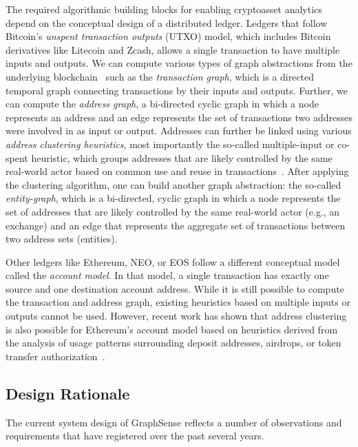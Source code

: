 The required algorithmic building blocks for enabling cryptoasset analytics depend on the conceptual design of a distributed ledger. Ledgers that follow Bitcoin's \emph{unspent transaction outputs} (UTXO) model, which includes Bitcoin derivatives like Litecoin and Zcash, allows a single transaction to have multiple inputs and outputs. We can compute various types of graph abstractions from the underlying blockchain~\cite{Reid:2013aa} such as the \emph{transaction graph}, which is a directed temporal graph connecting transactions by their inputs and outputs. Further, we can compute the \emph{address graph}, a bi-directed cyclic graph in which a node represents an address and an edge represents the set of transactions two addresses were involved in as input or output. Addresses can further be linked using various \emph{address clustering heuristics}, most importantly the so-called multiple-input or co-spent heuristic, which groups addresses that are likely controlled by the same real-world actor based on common use and reuse in transactions~\cite{Meiklejohn:2013aa}. After applying the clustering algorithm, one can build another graph abstraction: the so-called \emph{entity-graph}, which is a bi-directed, cyclic graph in which a node represents the set of addresses that are likely controlled by the same real-world actor (e.g., an exchange) and an edge that represents the aggregate set of transactions between two address sets (entities).

Other ledgers like Ethereum, NEO, or EOS follow a different conceptual model called the \emph{account model}. In that model, a single transaction has exactly one source and one destination account address. While it is still possible to compute the transaction and address graph, existing heuristics based on multiple inputs or outputs cannot be used. However, recent work has shown that address clustering is also possible for Ethereum's account model based on heuristics derived from the analysis of usage patterns surrounding deposit addresses, airdrops, or token transfer authorization~\cite{Victor:2020b}.

\subsection{Design Rationale}

The current system design of GraphSense reflects a number of observations and requirements that have registered over the past several years.

